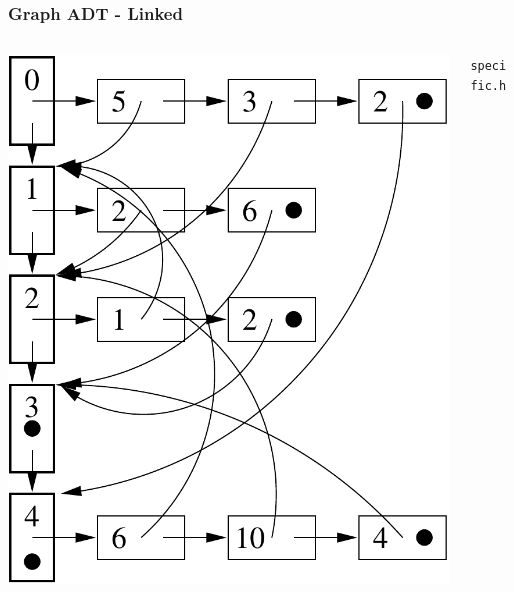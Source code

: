 
\begin{frame}[fragile]
\frametitle{Graph ADT - Linked}
\begin{columns}[T]

\begin{column}{0.55\textwidth}
\begin{center}
\includegraphics[height=0.75\textheight]{../Images/graphll.pdf}
\end{center}
\end{column}

\pause
\begin{column}{0.35\textwidth}
\verb^specific.h^

\end{column}


\end{columns}
\end{frame}


